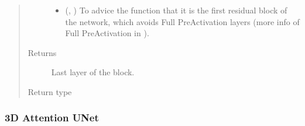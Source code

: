 \documentclass[letterpaper,10pt,english]{sphinxmanual}
\begin{document}
\begin{fulllineitems}
\begin{quote}
\begin{description}
\begin{itemize}
\item {} 
 (, ) \textendash{} To advice the function that it is the first residual block of the network, which avoids Full Pre\sphinxhyphen{}Activation
layers (more info of Full Pre\sphinxhyphen{}Activation in ).

\end{itemize}

\item[{Returns}] \leavevmode
{} \textendash{} Last layer of the block.

\item[{Return type}] \leavevmode
{}

\end{description}\end{quote}

\end{fulllineitems}



\subsubsection{3D Attention U\sphinxhyphen{}Net}
\label{\detokenize{models/att_unet_3d:module-models.attention_unet_3d}}\label{\detokenize{models/att_unet_3d:d-attention-u-net}}\label{\detokenize{models/att_unet_3d::doc}}
\end{document}
